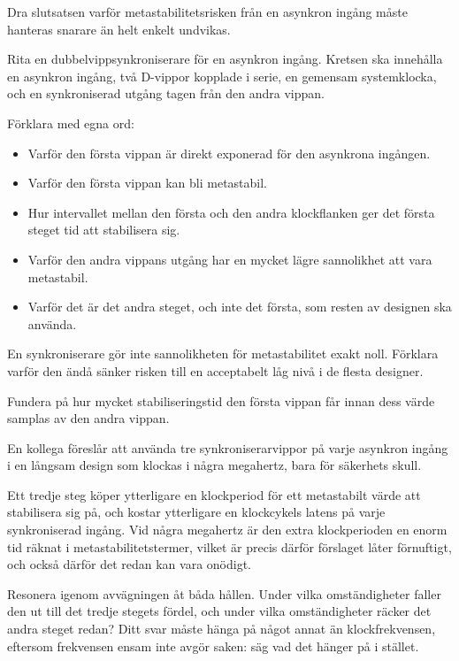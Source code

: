 Dra slutsatsen varför metastabilitetsrisken från en asynkron ingång måste hanteras snarare än helt
enkelt undvikas.


\label{c4:ex:chain}
Rita en dubbelvippsynkroniserare för en asynkron ingång. Kretsen ska innehålla en asynkron ingång,
två D-vippor kopplade i serie, en gemensam systemklocka, och en synkroniserad utgång tagen från den
andra vippan.

Förklara med egna ord:
\begin{itemize}
  \item Varför den första vippan är direkt exponerad för den asynkrona ingången.
  \item Varför den första vippan kan bli metastabil.
  \item Hur intervallet mellan den första och den andra klockflanken ger det första steget tid att
    stabilisera sig.
  \item Varför den andra vippans utgång har en mycket lägre sannolikhet att vara metastabil.
  \item Varför det är det andra steget, och inte det första, som resten av designen ska använda.
\end{itemize}

En synkroniserare gör inte sannolikheten för metastabilitet exakt noll. Förklara varför den ändå
sänker risken till en acceptabelt låg nivå i de flesta designer.

\note[Tips]Fundera på hur mycket stabiliseringstid den första vippan får innan dess värde samplas
av den andra vippan.

\label{c4:ex:third}
En kollega föreslår att använda tre synkroniserarvippor på varje asynkron ingång i en långsam
design som klockas i några megahertz, bara för säkerhets skull.

Ett tredje steg köper ytterligare en klockperiod för ett metastabilt värde att stabilisera sig på,
och kostar ytterligare en klockcykels latens på varje synkroniserad ingång. Vid några megahertz är
den extra klockperioden en enorm tid räknat i metastabilitetstermer, vilket är precis därför
förslaget låter förnuftigt, och också därför det redan kan vara onödigt.

 Resonera igenom avvägningen åt båda hållen. Under vilka omständigheter faller den ut till
det tredje stegets fördel, och under vilka omständigheter räcker det andra steget redan? Ditt svar
måste hänga på något annat än klockfrekvensen, eftersom frekvensen ensam inte avgör saken: säg vad
det hänger på i stället.

